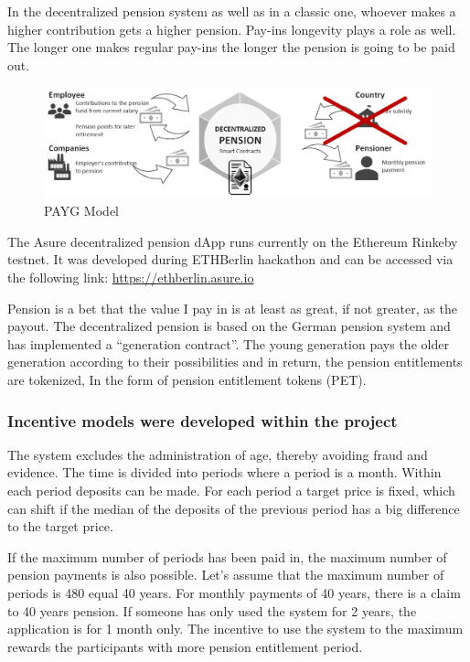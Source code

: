 In the decentralized pension system as well as in a classic one, whoever makes a higher contribution gets a higher pension. Pay-ins longevity plays a role as well. The longer one makes regular pay-ins the longer the pension is going to be paid out.

\begin{figure}[H]
    \centering
    \includegraphics[width=5.0in]{img/pension.png}
    \caption{PAYG Model}
    \label{fig:payg}
\end{figure}

The Asure decentralized pension dApp runs currently on the Ethereum Rinkeby testnet. It was developed during ETHBerlin hackathon and can be accessed via the following link: 
\url{https://ethberlin.asure.io}

Pension is a bet that the value I pay in is at least as great, if not greater, as the payout. The decentralized pension is based on the German pension system and has implemented a “generation contract”. The young generation pays the older generation according to their possibilities and in return, the pension entitlements are tokenized, In the form of pension entitlement tokens (PET).
\newline\newline

\subsubsection*{Incentive models were developed within the project}
The system excludes the administration of age, thereby avoiding fraud and evidence. The time is divided into periods where a period is a month. Within each period deposits can be made. For each period a target price is fixed, which can shift if the median of the deposits of the previous period has a big difference to the target price. 

If the maximum number of periods has been paid in, the maximum number of pension payments is also possible. Let's assume that the maximum number of periods is 480 equal 40 years. For monthly payments of 40 years, there is a claim to 40 years pension. If someone has only used the system for 2 years, the application is for 1 month only. The incentive to use the system to the maximum rewards the participants with more pension entitlement period.

